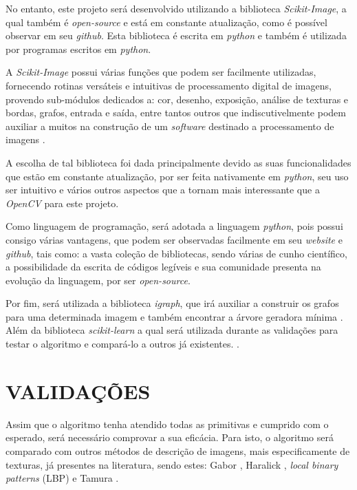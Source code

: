 \par No entanto, este projeto será desenvolvido utilizando a biblioteca \textit{Scikit-Image}, a qual também é \textit{open-source} e está em constante atualização, como é possível observar em seu \textit{github}. Esta biblioteca é escrita em \textit{python} e também é utilizada por programas escritos em \textit{python}.

\par A \textit{Scikit-Image} possui várias funções que podem ser facilmente utilizadas, fornecendo rotinas versáteis e intuitivas de processamento digital de imagens, provendo sub-módulos dedicados a: cor, desenho, exposição, análise de texturas e bordas, grafos, entrada e saída, entre tantos outros que indiscutivelmente podem auxiliar a muitos na construção de um \textit{software} destinado a processamento de imagens  \cite{ScikitImage}.

\par A escolha de tal biblioteca foi dada principalmente devido as suas funcionalidades que estão em constante atualização, por ser feita nativamente em \textit{python}, seu uso ser intuitivo e vários outros aspectos que a tornam mais interessante que a \textit{OpenCV} para este projeto.

\par Como linguagem de programação, será adotada a linguagem \textit{python}, pois possui consigo várias vantagens, que podem ser observadas facilmente em seu \textit{website} e \textit{github}, tais como: a vasta coleção de bibliotecas, sendo várias de cunho científico, a possibilidade da escrita de códigos legíveis e sua comunidade presenta na evolução da linguagem, por ser \textit{open-source}.

\par Por fim, será utilizada a biblioteca \textit{igraph}, que irá auxiliar a construir os grafos para uma determinada imagem e também encontrar a árvore geradora mínima \cite{igraph}. Além da biblioteca \textit{scikit-learn} a qual será utilizada durante as validações para testar o algoritmo e compará-lo a outros já existentes. \cite{scikit-learn}.

\section{VALIDAÇÕES}
\label{sec:validacoes}

\par Assim que o algoritmo tenha atendido todas as primitivas e cumprido com o esperado, será necessário comprovar a sua eficácia. Para isto, o algoritmo será comparado com outros métodos de descrição de imagens, mais especificamente de texturas, já presentes na literatura, sendo estes: Gabor \cite{gaborZhang2000content}, Haralick \cite{haralick1973textural}, \textit{local binary patterns} (LBP) \cite{lbp-guo2010rotation} e Tamura \cite{tamura1978textural}.

